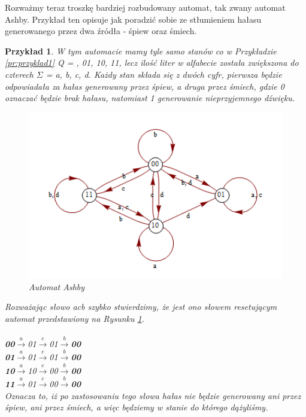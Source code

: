 \documentclass[12pt,a4paper]{article}
\newtheorem{pr}{Przyk{\l}ad}[section]
\begin{document}
Rozwa\.{z}my teraz troszk\k{e} bardziej rozbudowany automat, tak zwany automat Ashby. Przyk{\l}ad ten opisuje jak poradzi\'{c} sobie ze st{\l}umieniem ha{\l}asu generowanego przez dwa \'{z}r\'{o}d{\l}a - \'{s}piew oraz \'{s}miech.

\begin{pr}
W tym automacie mamy tyle samo stan\'{o}w co w Przyk{\l}adzie \ref{pr:przyklad1}  Q = , 01, 10, 11\textbraceright, lecz ilo\'{s}\'{c} liter w alfabecie zosta{\l}a zwi\k{e}kszona do czterech $\Sigma$ = \textbraceleft a, b, c, d\textbraceright. Ka\.{z}dy stan sk{\l}ada si\k{e} z dw\'{o}ch cyfr, pierwsza b\k{e}dzie odpowiada{\l}a za ha{\l}as generowany przez \'{s}piew, a druga przez \'{s}miech, gdzie \textit{0} oznacza\'{c} b\k{e}dzie brak ha{\l}asu, natomiast \textit{1} generowanie nieprzyjemnego d\'{z}wi\k{e}ku.

\begin{figure}[H]
    \centering
    \includegraphics[width=1.05\textwidth]{rysunek2}
    \caption{Automat Ashby}
    \label{fig:rysunek2}
\end{figure}

Rozwa\.{z}aj\k{a}c s{\l}owo \textit{acb} szybko stwierdzimy, \.{z}e jest ono s{\l}owem resetuj\k{a}cym automat przedstawiony na Rysunku \ref{fig:rysunek2}.\\
\\
\textbf{00}$\xrightarrow{a}$01$\xrightarrow{c}$01$\xrightarrow{b}$\textbf{00}\\
\textbf{01}$\xrightarrow{a}$01$\xrightarrow{c}$01$\xrightarrow{b}$\textbf{00}\\
\textbf{10}$\xrightarrow{a}$10$\xrightarrow{c}$00$\xrightarrow{b}$\textbf{00}\\
\textbf{11}$\xrightarrow{a}$01$\xrightarrow{c}$00$\xrightarrow{b}$\textbf{00}\\

Oznacza to, i\.{z} po zastosowaniu tego s{\l}owa ha{\l}as nie b\k{e}dzie generowany ani przez \'{s}piew, ani przez \'{s}miech, a wi\k{e}c b\k{e}dziemy w stanie do kt\'{o}rego d\k{a}\.{z}yli\'{s}my.
\end{pr}
\end{document}
